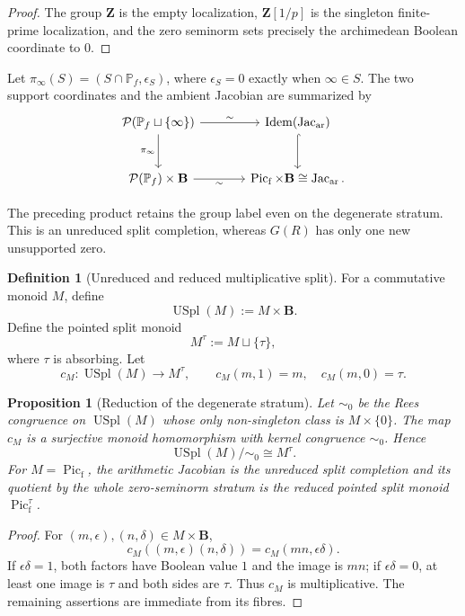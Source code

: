 \documentclass[11pt]{amsart}
\numberwithin{equation}{section}
\newtheorem{proposition}[theorem]{Proposition}
\theoremstyle{definition}
\newtheorem{definition}[theorem]{Definition}
\newcommand{\B}{\mathbf B}
\newcommand{\Z}{\mathbf Z}
\newcommand{\Picf}{\operatorname{Pic}_{\mathrm f}}
\newcommand{\Jacar}{\operatorname{Jac}_{\mathrm{ar}}}
\newcommand{\Idem}{\operatorname{Idem}}
\begin{document}
\begin{proof}
The group $\Z$ is the empty localization, $\Z[1/p]$ is the singleton
finite-prime localization, and the zero seminorm sets precisely the
archimedean Boolean coordinate to $0$.
\end{proof}

Let $\pi_{\infty}(S)=(S\cap\mathbb P_f,\epsilon_S)$, where $\epsilon_S=0$ exactly when $\infty\in S$.  The two support coordinates and the ambient Jacobian are summarized by
\[
\begin{tikzcd}[column sep=large,row sep=large]
\mathcal P(\mathbb P_f\sqcup\{\infty\})
  \arrow[r,"\sim"] \arrow[d,"\pi_{\infty}"']
& \Idem(\Jacar) \arrow[d,hook]\\
\mathcal P(\mathbb P_f)\times\B
  \arrow[r,"\sim"']
& \Picf\times\B\cong\Jacar.
\end{tikzcd}
\]

The preceding product retains the group label even on the degenerate
stratum.  This is an unreduced split completion, whereas $G(R)$ has only
one new unsupported zero.

\begin{definition}[Unreduced and reduced multiplicative split]
\label{def:unreduced-multiplicative-split}
For a commutative monoid $M$, define
\[
\operatorname{USpl}(M):=M\times\B.
\]
Define the pointed split monoid
\[
M^\tau:=M\sqcup\{\tau\},
\]
where $\tau$ is absorbing.  Let
\[
c_M:\operatorname{USpl}(M)\to M^\tau,
\qquad
c_M(m,1)=m,
\quad
c_M(m,0)=\tau.
\]
\end{definition}

\begin{proposition}[Reduction of the degenerate stratum]
\label{prop:jacobian-reduction}
Let $\sim_0$ be the Rees congruence on $\operatorname{USpl}(M)$ whose only
non-singleton class is $M\times\{0\}$.  The map $c_M$ is a surjective
monoid homomorphism with kernel congruence $\sim_0$.  Hence
\[
\operatorname{USpl}(M)/{\sim_0}\cong M^\tau.
\]
For $M=\Picf$, the arithmetic Jacobian is the unreduced split completion
and its quotient by the whole zero-seminorm stratum is the reduced pointed
split monoid $\Picf^\tau$.
\end{proposition}

\begin{proof}
For $(m,\epsilon),(n,\delta)\in M\times\B$,
\[
c_M((m,\epsilon)(n,\delta))
=c_M(mn,\epsilon\delta).
\]
If $\epsilon\delta=1$, both factors have Boolean value $1$ and the image is
$mn$; if $\epsilon\delta=0$, at least one image is $\tau$ and both sides
are $\tau$.  Thus $c_M$ is multiplicative.  The remaining assertions are
immediate from its fibres.
\end{proof}
\end{document}
